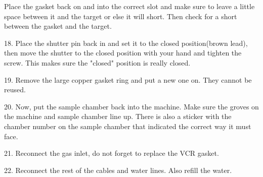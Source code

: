 \documentclass[letterpaper,11pt]{texMemo} %
\begin{document}
Place the gasket back on and into the correct slot and make sure to leave a little space between it and the target or else it will short. Then check for a 		short between the gasket and the target.

18. Place the shutter pin back in and set it to the closed position(brown lead), then move the shutter to the closed position with your hand and tighten 		the screw. This makes sure the "closed" position is really closed.

19. Remove the large copper gasket ring and put a new one on. They cannot be reused.

20. Now, put the sample chamber back into the machine. Make sure the groves on the machine and sample chamber line up. There is also a sticker with the 		chamber number on the sample chamber that indicated the correct way it must face.

21. Reconnect the gas inlet, do not forget to replace the VCR gasket.

22. Reconnect the rest of the cables and water lines. Also refill the water.
\end{document}
